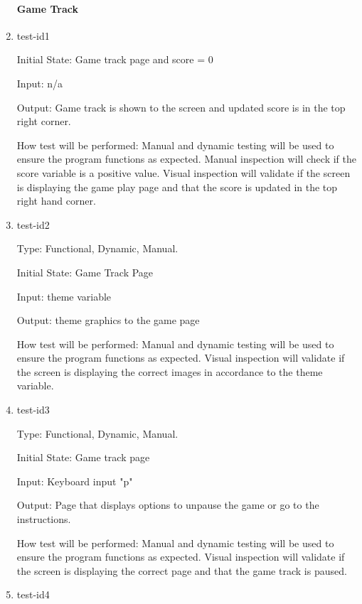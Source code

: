 \documentclass[12pt, titlepage]{article}
\begin{document}
\begin{enumerate}
		
\paragraph{Game Track}

\item{test-id1\\}

Initial State: Game track page and score = 0

Input: n/a

Output: Game track is shown to the screen and updated score is in the top right corner. 

How test will be performed: Manual and dynamic testing will be used to ensure the program functions as expected. Manual inspection will check if the score variable is a positive value. Visual inspection will validate if the screen is displaying the game play page and that the score is updated in the top right hand corner. 

\item{test-id2\\}

Type: Functional, Dynamic, Manual.

Initial State: Game Track Page

Input: theme variable

Output: theme graphics to the game page

How test will be performed: Manual and dynamic testing will be used to ensure the program functions as expected. Visual inspection will validate if the screen is displaying the correct images in accordance to the theme variable.   

\item{test-id3\\}

Type: Functional, Dynamic, Manual.

Initial State: Game track page

Input: Keyboard input "p"

Output: Page that displays options to unpause the game or go to the instructions. 

How test will be performed: Manual and dynamic testing will be used to ensure the program functions as expected. Visual inspection will validate if the screen is displaying the correct page and that the game track is paused.

\item{test-id4\\}


\end{enumerate}
\end{document}

